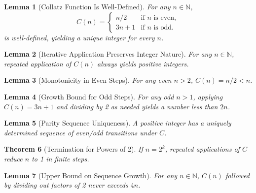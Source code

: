 \documentclass[11pt]{article}
\newtheorem{theorem}{Theorem}[section]
\newtheorem{lemma}[theorem]{Lemma}
\begin{document}
\begin{lemma}[Collatz Function Is Well-Defined]
For any \( n \in \mathbb{N} \),
\[
C(n) = 
\begin{cases} 
n/2 & \text{if } n \text{ is even}, \\
3n + 1 & \text{if } n \text{ is odd}.
\end{cases}
\]
is well-defined, yielding a unique integer for every \( n \).
\end{lemma}

\begin{lemma}[Iterative Application Preserves Integer Nature]
For any \( n \in \mathbb{N} \), repeated application of \( C(n) \) always yields positive integers.
\end{lemma}

\begin{lemma}[Monotonicity in Even Steps]
For any even \( n > 2 \), \( C(n) = n/2 < n \).
\end{lemma}

\begin{lemma}[Growth Bound for Odd Steps]
For any odd \( n > 1 \), applying \( C(n) = 3n+1 \) and dividing by 2 as needed yields a number less than \(2n\).
\end{lemma}

\begin{lemma}[Parity Sequence Uniqueness]
A positive integer has a uniquely determined sequence of even/odd transitions under \( C \).
\end{lemma}

\begin{theorem}[Termination for Powers of 2]
If \( n = 2^k \), repeated applications of \( C \) reduce \( n \) to 1 in finite steps.
\end{theorem}

\begin{lemma}[Upper Bound on Sequence Growth]
For any \( n \in \mathbb{N} \), \( C(n) \) followed by dividing out factors of 2 never exceeds \(4n\).
\end{lemma}
\end{document}
